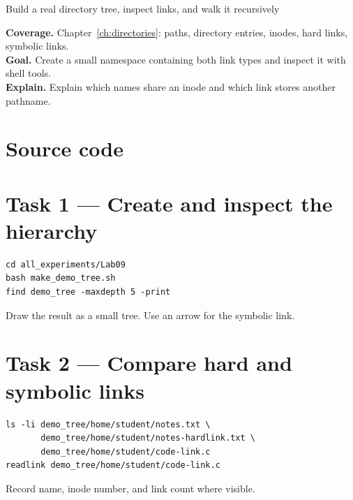 \begin{labproject}{Build a real directory tree, inspect links, and walk it recursively}

\textbf{Coverage.} Chapter~\ref{ch:directories}: paths, directory entries, inodes, hard links, symbolic links.\\
\textbf{Goal.} Create a small namespace containing both link types and inspect it with shell tools.\\
\textbf{Explain.} Explain which names share an inode and which link stores another pathname.

\section*{Source code}




\section*{Task 1 --- Create and inspect the hierarchy}
\begin{lstlisting}[style=utpbash]
cd all_experiments/Lab09
bash make_demo_tree.sh
find demo_tree -maxdepth 5 -print
\end{lstlisting}
Draw the result as a small tree. Use an arrow for the symbolic link.

\section*{Task 2 --- Compare hard and symbolic links}
\begin{lstlisting}[style=utpbash]
ls -li demo_tree/home/student/notes.txt \
       demo_tree/home/student/notes-hardlink.txt \
       demo_tree/home/student/code-link.c
readlink demo_tree/home/student/code-link.c
\end{lstlisting}
Record name, inode number, and link count where visible.


\end{labproject}
